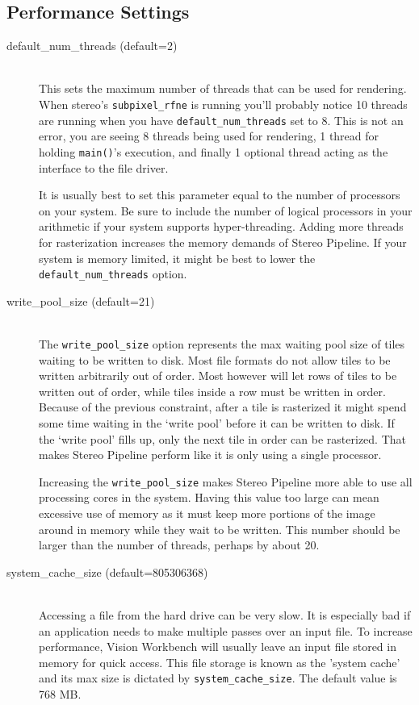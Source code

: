 \subsection{Performance Settings}

\begin{description}

\item[default\_num\_threads \textnormal (default=2)] \hfill \\
This sets the maximum number of threads that can be used for
rendering. When stereo's \texttt{subpixel\_rfne} is running you'll
probably notice 10 threads are running when you have
\texttt{default\_num\_threads} set to 8. This is not an error, you are
seeing 8 threads being used for rendering, 1 thread for holding
\texttt{main()}'s execution, and finally 1 optional thread acting as the
interface to the file driver.

It is usually best to set this parameter equal to the number of
processors on your system. Be sure to include the number of logical
processors in your arithmetic if your system supports hyper-threading.
Adding more threads for rasterization increases the memory demands of
Stereo Pipeline. If your system is memory limited, it might be best to
lower the \texttt{default\_num\_threads} option.

\item[write\_pool\_size \textnormal (default=21)] \hfill \\
The \texttt{write\_pool\_size} option represents the max waiting pool
size of tiles waiting to be written to disk. Most file formats do not
allow tiles to be written arbitrarily out of order. Most however will
let rows of tiles to be written out of order, while tiles inside a row
must be written in order. Because of the previous constraint, after a
tile is rasterized it might spend  some time waiting in the `write
pool' before it can be written to disk. If the `write pool' fills up,
only the next tile in order can be rasterized. That makes Stereo
Pipeline perform like it is only using a single processor.

Increasing the \texttt{write\_pool\_size} makes Stereo Pipeline more
able to use all processing cores in the system. Having this value too
large can mean excessive use of memory as it must keep more portions
of the image around in memory while they wait to be written. This 
number should be larger than the number of threads, perhaps by
about 20.

\item[system\_cache\_size \textnormal (default=805306368)] \hfill \\
Accessing a file from the hard drive can be very slow. It is especially
bad if an application needs to make multiple passes over an input
file. To increase performance, Vision Workbench will usually leave an
input file stored in memory for quick access. This file storage is
known as the 'system cache' and its max size is dictated by
\texttt{system\_cache\_size}. The default value is 768 MB.


\end{description}
